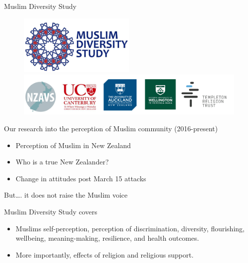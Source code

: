 \documentclass[
  ignorenonframetext,
  aspectratio=169,
]{beamer}
\providecommand{\tightlist}{%
  \setlength{\itemsep}{0pt}\setlength{\parskip}{0pt}}\usepackage{longtable,booktabs,array}
\begin{document}
\begin{frame}{Muslim Diversity Study}
\label{muslim-diversity-study}
\begin{figure}

\begin{minipage}{\linewidth}
\begin{center}
\includegraphics[width=0.5\textwidth,height=\textheight]{figs/mds.png}
\end{center}
\end{minipage}%
\newline
\begin{minipage}{\linewidth}
\includegraphics{figs/sponsors.png}\end{minipage}%

\end{figure}%
\end{frame}

\begin{frame}{Our research into the perception of Muslim community
(2016-present)}
\label{our-research-into-the-perception-of-muslim-community-2016-present}
\begin{itemize}[<+->]
\tightlist
\item
  Perception of Muslim in New Zealand
\item
  Who is a true New Zealander?
\item
  Change in attitudes post March 15 attacks
\end{itemize}
\end{frame}

\begin{frame}{But\ldots. it does not raise the Muslim voice}
\label{but.-it-does-not-raise-the-muslim-voice}
\end{frame}

\begin{frame}{Muslim Diversity Study covers}
\label{muslim-diversity-study-covers}
\begin{itemize}[<+->]
\tightlist
\item
  Muslims self-perception, perception of discrimination, diversity,
  flourishing, wellbeing, meaning-making, resilience, and health
  outcomes.
\item
  More importantly, effects of religion and religious support.
\end{itemize}
\end{frame}
\end{document}
